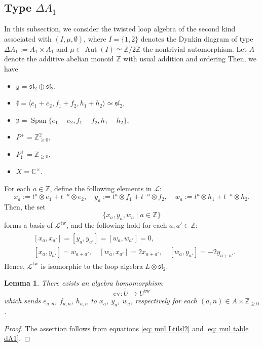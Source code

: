 \documentclass[12pt,a4paper]{amsart}
\newtheorem{lem}[thm]{Lemma}
\theoremstyle{definition}
\numberwithin{equation}{subsection}
\begin{document}
\subsection{Type $\Delta A_1$}
In this subsection, we consider the twisted loop algebra of the second kind associated with $(I,\mu,\emptyset)$, where
$I = \{1,2\}$ denotes the Dynkin diagram of type $\Delta A_1 := A_1 \times A_1$ and
$\mu \in \operatorname{Aut}(I) \simeq \mathbb{Z}/2\mathbb{Z}$ the nontrivial automorphism.
Let $A$ denote the additive abelian monoid $\mathbb{Z}$ with usual addition and ordering
Then, we have
\begin{itemize}
  \item $\mathfrak{g} = \mathfrak{sl}_2 \oplus \mathfrak{sl}_2$,
  \item $\mathfrak{k} = \langle e_1+e_2,f_1+f_2,h_1+h_2 \rangle \simeq \mathfrak{sl}_2$,
  \item $\mathfrak{p} = \operatorname{Span}\{ e_1-e_2,f_1-f_2,h_1-h_2 \}$,
  \item $P^+ = \mathbb{Z}_{\geq 0}^2$,
  \item $P_\mathfrak{k}^+ = \mathbb{Z}_{\geq 0}$,
  \item $X = \mathbb{C}^\times$.
\end{itemize}

For each $a \in \mathbb{Z}$, define the following elements in $\mathcal{L}$:
\[
  x_a := t^a \otimes e_1 + t^{-a} \otimes e_2, \quad y_a := t^a \otimes f_1 + t^{-a} \otimes f_2, \quad w_a := t^a \otimes h_1 + t^{-a} \otimes h_2.
\]
Then, the set
\[
  \{ x_a,y_a,w_a \mid a \in \mathbb{Z} \}
\]
forms a basis of $\mathcal{L}^\mathrm{tw}$, and the following hold for each $a,a' \in \mathbb{Z}$:
\begin{align}\label{eq: mul table dA1}
  \begin{split}
    &[x_a, x_{a'}] = [y_a, y_{a'}] = [w_a, w_{a'}] = 0,\\
    &[x_a, y_{a'}] = w_{a+a'},\quad [w_a, x_{a'}] = 2x_{a+a'}, \quad [w_a, y_{a'}] = -2y_{a+a'}.
  \end{split}
\end{align}
Hence, $\mathcal{L}^{\mathrm{tw}}$ is isomorphic to the loop algebra $L \otimes \mathfrak{sl}_2$.

\begin{lem}
  There exists an algebra homomorphism
  \[
    \mathrm{ev} : \tilde{U} \to U^{\mathrm{tw}}
  \]
  which sends $e_{a,n}$, $f_{a,n}$, $h_{a,n}$ to $x_a$, $y_a$, $w_a$, respectively for each $(a,n) \in A \times \mathbb{Z}_{\geq 0}$.
\end{lem}
\begin{proof}
  The assertion follows from equations \eqref{eq: mul Ltilsl2} and \eqref{eq: mul table dA1}.
\end{proof}
\end{document}
